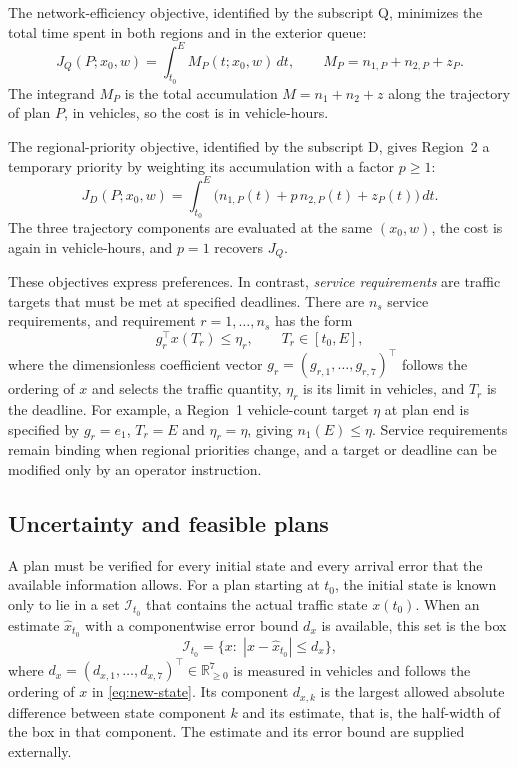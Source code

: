 \documentclass[final]{cas-sc}
\theoremstyle{definition}
\theoremstyle{plain}
\theoremstyle{definition}
\theoremstyle{plain}
\newcommand{\R}{\mathbb{R}}
\begin{document}
The network-efficiency objective, identified by the subscript Q,
minimizes the total time spent in both regions and in the exterior
queue:
\begin{equation}
J_Q(P;x_0,w)=\int_{t_0}^{E}M_P(t;x_0,w)\,dt,\qquad
M_P=n_{1,P}+n_{2,P}+z_P.
\label{eq:benchmark-queue-cost}
\end{equation}
The integrand $M_P$ is the total accumulation $M=n_1+n_2+z$ along the
trajectory of plan $P$, in vehicles, so the cost is in vehicle-hours.

The regional-priority objective, identified by the subscript D, gives
Region~2 a temporary priority by weighting its accumulation with a
factor $p\ge1$:
\begin{equation}
J_D(P;x_0,w)=\int_{t_0}^{E}
\big(n_{1,P}(t)+p\,n_{2,P}(t)+z_P(t)\big)\,dt.
\label{eq:benchmark-priority-cost}
\end{equation}
The three trajectory components are evaluated at the same $(x_0,w)$,
the cost is again in vehicle-hours, and $p=1$ recovers $J_Q$.

These objectives express preferences. In contrast, \emph{service
requirements} are traffic targets that must be met at specified
deadlines. There are $n_s$ service requirements, and requirement
$r=1,\ldots,n_s$ has the form
\begin{equation}
g_r^\top x(T_r)\le\eta_r,\qquad T_r\in[t_0,E],
\label{eq:new-service}
\end{equation}
where the dimensionless coefficient vector
$g_r=(g_{r,1},\ldots,g_{r,7})^\top$ follows the ordering of $x$ and
selects the traffic quantity, $\eta_r$ is its limit in vehicles, and
$T_r$ is the deadline. For example, a Region~1 vehicle-count target
$\eta$ at plan end is specified by $g_r=e_1$, $T_r=E$ and
$\eta_r=\eta$, giving $n_1(E)\le\eta$. Service requirements remain
binding when regional priorities change, and a target or deadline can
be modified only by an operator instruction.

\subsection{Uncertainty and feasible plans}
\label{sec:problem-uncertainty}

A plan must be verified for every initial state and every arrival
error that the available information allows. For a plan starting at
$t_0$, the initial state is known only to lie in a set
$\mathcal I_{t_0}$ that contains the actual traffic state $x(t_0)$.
When an estimate $\widehat x_{t_0}$ with a componentwise error bound
$d_x$ is available, this set is the box
\begin{equation}
\mathcal I_{t_0}=\{x:\;|x-\widehat x_{t_0}|\le d_x\},
\label{eq:benchmark-contract}
\end{equation}
where $d_x=(d_{x,1},\ldots,d_{x,7})^\top\in\R^7_{\ge0}$ is measured in
vehicles and follows the ordering of $x$ in
\eqref{eq:new-state}. Its component $d_{x,k}$ is the largest
allowed absolute difference between state component $k$ and its
estimate, that is, the half-width of the box in that component. The
estimate and its error bound are supplied externally.
\end{document}
